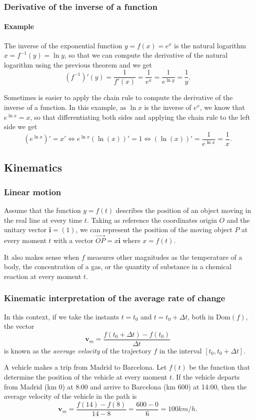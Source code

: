 \begin{frame}
\frametitle{Derivative of the inverse of a function}
\framesubtitle{Example}
The inverse of the exponential function $y=f(x)=e^x$ is the natural logarithm $x=f^{-1}(y)=\ln y$, so that we can compute the derivative of the natural logarithm using the previous theorem and we get
\[
\left(f^{-1}\right)'(y)=\frac{1}{f'(x)}=\frac{1}{e^x}=\frac{1}{e^{\ln y}}=\frac{1}{y}.
\]

 Sometimes is easier to apply the chain rule to compute the derivative of the inverse of a function. 
In this example, as $\ln x$ is the inverse of $e^x$, we know that $e^{\ln x}=x$, so that differentiating both sides and applying the chain rule to the left side we get
\[
(e^{\ln x})'=x' \Leftrightarrow e^{\ln x}(\ln(x))' = 1 \Leftrightarrow (\ln(x))'=\frac{1}{e^{\ln x}}=\frac{1}{x}.
\]
\end{frame}



\subsection{Kinematics}
\begin{frame}
\frametitle{Linear motion}
Assume that the function $y=f(t)$ describes the position of an object moving in the real line at every time $t$.
Taking as reference the coordinates origin $O$ and the unitary vector $\mathbf{i}=(1)$, we can represent the position of the moving object $P$ at every moment $t$ with a vector $\vec{OP}=x\mathbf{i}$ where $x=f(t)$.
\begin{center}

\end{center}

 It also makes sense when $f$ measures other magnitudes as the temperature of a body, the concentration of a gas, or the quantity of substance in a chemical reaction at every moment $t$.
\end{frame}


\begin{frame}
\frametitle{Kinematic interpretation of the average rate of change}
In this context, if we take the instants $t=t_0$ and $t=t_0+\Delta t$, both in $\mbox{Dom}(f)$, the vector
\[
\mathbf{v}_m=\frac{f(t_0+\Delta t)-f(t_0)}{\Delta t}
\]
is known as the \emph{average velocity} of the trajectory $f$ in the interval $[t_0, t_0+\Delta t]$.

A vehicle makes a trip from Madrid to Barcelona.
Let $f(t)$ be the function that determine the position of the vehicle at every moment $t$.
If the vehicle departs from Madrid (km 0) at 8:00 and arrive to Barcelona (km 600) at 14:00, then the average velocity
of the vehicle in the path is
\[
\mathbf{v}_m=\frac{f(14)-f(8)}{14-8}=\frac{600-0}{6} = 100 km/h.
\]
\end{frame}


